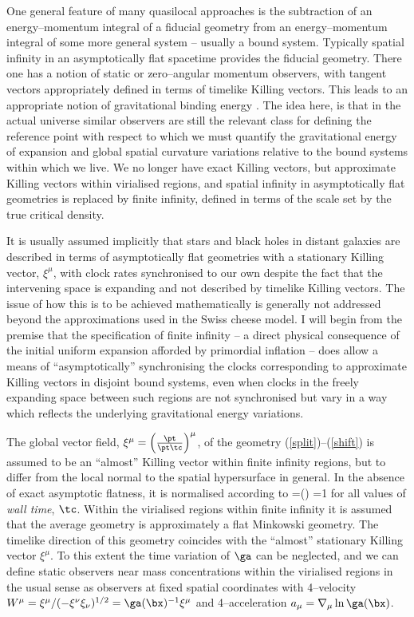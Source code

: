 \documentclass[12pt]{iopart}
\begin{document}
One general feature of many quasilocal approaches is the subtraction of an
energy--momentum integral of a fiducial geometry from an energy--momentum
integral of some more general system -- usually a bound system. Typically
spatial infinity in an asymptotically flat spacetime provides the fiducial
geometry. There one has a notion of static or
zero--angular momentum observers, with tangent
vectors appropriately defined in terms of timelike Killing vectors. This leads
to an appropriate notion of gravitational binding energy \cite{KLB}.
The idea here, is that in the actual universe similar observers are still
the relevant class for defining the reference
point with respect to which we must quantify the gravitational energy
of expansion and global spatial curvature variations relative to the bound
systems within which we live. We no longer have exact Killing vectors, but
approximate Killing vectors within virialised regions, and spatial
infinity in asymptotically flat geometries is replaced by finite infinity,
defined in terms of the scale set by the true critical density.

It is usually assumed implicitly that stars and black holes in distant galaxies
are described in terms of asymptotically flat geometries with a stationary
Killing vector, $\xi^\mu$, with clock rates synchronised to our own
despite the fact that the intervening space is expanding and
not described by timelike Killing vectors. The issue of how this is to be
achieved mathematically is generally not addressed beyond the
approximations used in the Swiss cheese model. I will begin from the premise
that the specification of finite infinity -- a direct physical consequence
of the initial uniform expansion afforded by primordial inflation -- does
allow a means of ``asymptotically'' synchronising the clocks corresponding
to approximate Killing vectors in disjoint bound systems, even when
clocks in the freely expanding space between such regions are not
synchronised but vary in a way which reflects the underlying gravitational
energy variations.

The global vector field, $\xi^\mu=\left(\pt\over\pt\tc\right)^\mu$, of the
geometry (\ref{split})--(\ref{shift}) is assumed to be an ``almost'' Killing
vector within finite infinity regions, but to differ from the local normal
to the spatial hypersurface in general. In the absence of exact
asymptotic flatness, it is normalised according to
\beq
{}\Z{\Fi}=\ave{\ga(\tc,\bx)}\Z{\Fi}\equiv\ga\Z{\Fi}(\tc)
=1
\eeq
for all values of {\em wall time}, $\tc$. Within the virialised regions
within finite infinity it is assumed that the average geometry is
approximately a flat Minkowski geometry. The timelike direction of this
geometry coincides with the ``almost'' stationary Killing vector $\xi^\mu$.
To this extent the time variation of $\ga$ can be neglected, and we can
define static observers near mass concentrations within the virialised
regions in the usual sense as observers at fixed spatial coordinates with
4--velocity $W^\mu=\xi^\mu/(-\xi^\nu\xi_\nu)^{1/2}=\ga(\bx)^{-1}\xi^\mu$ and
4--acceleration $a_\mu=\nabla_\mu\ln\ga(\bx)$.
\end{document}
